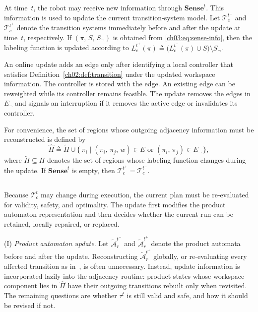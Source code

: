 At time~$t$, the robot may receive new information through
$\textbf{Sense}^t$. This information is used to update the current
transition-system model. Let $\mathcal{T}_c^{t^-}$ and
$\mathcal{T}_c^{t^+}$ denote the transition systems immediately before and
after the update at time~$t$, respectively.
If $(\pi,\, S,\, S_{\neg})$ is obtained from \eqref{ch03:eq:sense-info}, then
the labeling function is updated according to
$L_c^{t^+}(\pi) \triangleq
\big(L_c^{t^-}(\pi) \cup S\big) \setminus S_{\neg}$.
\begin{revision}
An online update adds an edge only after identifying a local controller
that satisfies Definition~\ref{ch02:def:transition} under the updated
workspace information. The controller is stored with the edge. An
existing edge can be reweighted while its controller remains feasible.
The update removes the edges in $E_{\neg}$ and signals an interruption
if it removes the active edge or invalidates its controller.
\end{revision}
For convenience, the set of regions whose outgoing adjacency information
must be reconstructed is defined by
\begin{equation}
\widehat{\Pi} \triangleq
\widetilde{\Pi} \cup
\{\, \pi_i \mid (\pi_i,\, \pi_j,\, w) \in E
\text{ or } (\pi_i,\, \pi_j) \in E_{\neg} \,\},
\label{ch03:eq:widehat}
\end{equation}
where $\widetilde{\Pi} \subseteq \Pi$ denotes the set of regions whose labeling
function changes during the update. If $\textbf{Sense}^t$ is empty, then
$\mathcal{T}_c^{t^+} = \mathcal{T}_c^{t^-}$.

\subsection{}\label{ch03:subsec:realtime}

Because $\mathcal{T}_c^t$ may change during execution, the current plan must
be re-evaluated for validity, safety, and optimality. The update first modifies
the product automaton representation and then decides whether the current run
can be retained, locally repaired, or replaced.

(I) \emph{Product automaton update}.
Let $\tilde{\mathcal{A}}_r^{t^-}$ and $\tilde{\mathcal{A}}_r^{t^+}$ denote the
product automata before and after the update. Reconstructing
$\tilde{\mathcal{A}}_r^{t^+}$ globally, or re-evaluating every affected
transition as in~\citep{guo2013revising}, is often unnecessary. Instead, update
information is incorporated lazily into the adjacency routine: product states
whose workspace component lies in $\widehat{\Pi}$ have their outgoing
transitions rebuilt only when revisited. The remaining questions are whether
$\tau^t$ is still valid and safe, and how it should be revised if not.

